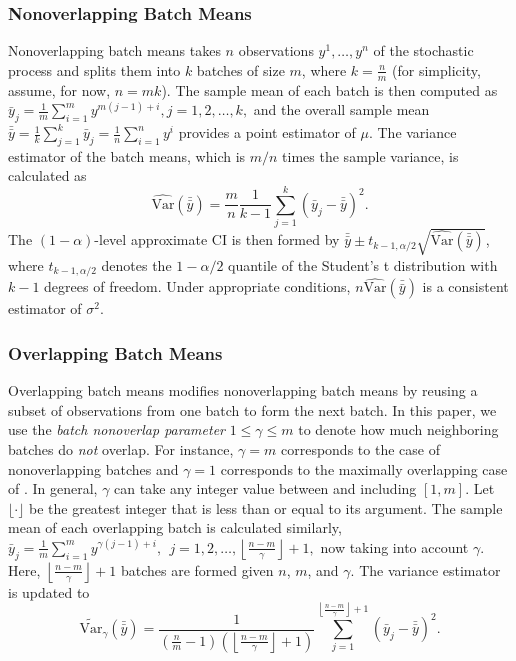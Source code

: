 \documentclass[12pt]{article}
\newcommand{\vartg}[1]{\widetilde{\mathrm{Var}}_\gamma \left( #1 \right)}
\newcommand{\varhat}{\widehat{\mathrm{Var}}}
\newcommand{\nb}{\left\lfloor\tfrac{n-m}{\gamma}\right\rfloor+1}
\newcommand{\yb}{\bar{y}}
\newcommand{\ybb}{\bar{\yb}}
\begin{document}
\subsubsection{Nonoverlapping Batch Means}

Nonoverlapping batch means takes $n$ observations $y^1, \dots, y^n$ of the stochastic process and splits them into $k$ batches of size $m$, where $k = \frac{n}{m}$ (for simplicity, assume, for now, $n = mk$).  
The sample mean of each batch is then computed as
$
	\yb_j = \frac{1}{m} \sum_{i=1}^{m} y^{m(j-1)+i}, j = 1,2, \dots, k,
$
and the overall sample mean $\ybb = \frac{1}{k} \sum_{j=1}^k \yb_j = \frac{1}{n} \sum_{i=1}^n y^i$ provides a point estimator of $\mu$.  
The variance estimator of the batch means, which is $m/n$ times the sample variance, is calculated as
\begin{equation} \label{eq:var}
	\varhat(\ybb) = \frac{m}{n}\frac{1}{k-1} \sum_{j=1}^k \left( \yb_j - \ybb \right)^2.
\end{equation}
The $(1-\alpha)$-level approximate CI is then formed by $\ybb \pm t_{k-1,\alpha/2} \sqrt{\varhat(\ybb)}$, where $t_{k-1,\alpha/2}$ denotes the $1-\alpha/2$ quantile of the Student's t distribution with $k-1$ degrees of freedom.  
Under appropriate conditions, $n\varhat(\ybb)$ is a consistent estimator of $\sigma^2$.

\subsubsection{Overlapping Batch Means}
\label{ssec:overlap}

Overlapping batch means modifies nonoverlapping batch means by reusing a subset of observations from one batch to form the next batch. 
In this paper, we use the {\it batch nonoverlap parameter} $1 \leq \gamma \leq m$ to denote how much neighboring batches do {\it not} overlap.  
For instance, $\gamma = m$ corresponds to the case of nonoverlapping batches and $\gamma = 1$ corresponds to the maximally overlapping case of \citet{Meketon1984}.  
In general, $\gamma$ can take any integer value between and including $[1,m]$. 
Let $\lfloor \cdot \rfloor$ be the greatest integer that is less than or equal to its argument. 
The sample mean of each overlapping batch is calculated similarly, 
$
\yb_j = \frac{1}{m} \sum_{i=1}^m y^{\gamma(j-1) + i},\ \  j = 1, 2, \dots, \nb, 
$
now taking into account $\gamma$.  
Here, $\nb$ batches are formed given $n$, $m$, and $\gamma$.  
The variance estimator is updated to
\begin{equation} \label{eq:variance_gamma}
	\vartg{\ybb} = \frac{1}{\left( \tfrac{n}{m} - 1 \right) \left( \nb \right)}  \sum_{j=1}^{\nb} (\yb_j - \ybb)^2.
\end{equation}
\end{document}
